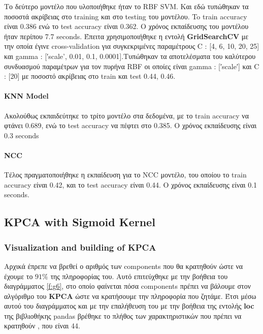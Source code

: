 Το δεύτερο μοντέλο που υλοποιήθηκε ήταν το RBF SVM. Και εδώ τυπώθηκαν τα ποσοστά
ακρίβειας στο training και στο testing του μοντέλου. To train accuracy είναι 0.386 ενώ το test accuracy είναι 0.362. Ο χρόνος εκπαίδευσης του μοντέλου ήταν περίπου 7.7 seconds.
Έπειτα χρησιμοποιήθηκε η εντολή \textbf{GridSearchCV} με την οποία έγινε cross-validation για συγκεκριμένες παραμέτρους C : [4, 6, 10, 20, 25] και gamma : [′scale', 0.01, 0.1, 0.0001].Τυπώθηκαν τα αποτελέσματα του καλύτερου
συνδυασμού παραμέτρων για τον πυρήνα RBF οι οποίες είναι gamma : [′scale′] και C :
[20] με ποσοστό ακρίβειας στο train και test 0.44, 0.46.

\paragraph{KNN Model}
Ακολούθως εκπαιδεύτηκε το τρίτο μοντέλο στα δεδομένα, με το train accuracy να φτάνει 0.689, ενώ το test accuracy να πέφτει στο 0.385. Ο χρόνος εκπαίδευσης είναι 0.3 seconds
\paragraph{NCC}
Τέλος πραγματοποιήθηκε η εκπαίδευση για το NCC μοντέλο, του οποίου το train accuracy είναι 0.42, και το test accuracy είναι 0.44. Ο χρόνος εκπαίδευσης είναι 0.1 seconds.
\clearpage


\subsection{KPCA with Sigmoid Kernel}
\subsubsection{Visualization and building of KPCA}
Αρχικά έπρεπε να βρεθεί ο αριθμός των components που θα κρατηθούν ώστε να έχουμε το $91\%$ της πληροφορίας του. Αυτό επιτεύχθηκε με την βοήθεια του διαγράμματος \ref{f:g6}, στο οποίο φαίνεται πόσα components πρέπει να βάλουμε στον αλγόριθμο του \textbf{KPCA} ώστε να κρατήσουμε την πληροφορία που ζητάμε. Έτσι μέσω αυτού του διαγράμματος και με την επαλήθευση του με την βοήθεια της εντολής \textbf{loc} της βιβλιοθήκης pandas βρέθηκε το πλήθος των χαρακτηριστικών που πρέπει να κρατηθούν , που είναι 44.

